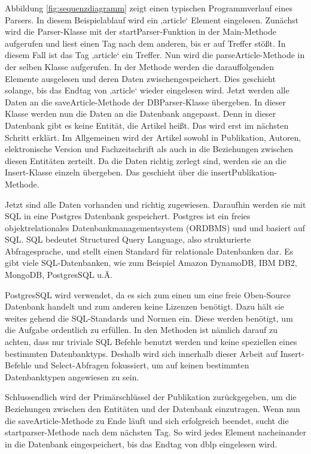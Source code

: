 Abbildung \ref{fig:sequenzdiagramm} zeigt einen typischen Programmverlauf eines Parsers. In diesem Beispielablauf wird ein ‚article‘ Element eingelesen. Zunächst wird die Parser-Klasse mit der startParser-Funktion in der Main-Methode aufgerufen und liest einen Tag nach dem anderen, bis er auf Treffer stößt. In diesem Fall ist das Tag ‚article‘ ein Treffer. Nun wird die parseArticle-Methode in der selben Klasse aufgerufen. In der Methode werden die darauffolgenden Elemente ausgelesen und deren Daten zwischengespeichert. Dies geschieht solange, bis das Endtag von ‚article‘ wieder eingelesen wird. Jetzt werden alle Daten an die saveArticle-Methode der DBParser-Klasse übergeben. In dieser Klasse werden nun die Daten an die Datenbank angepasst. Denn in dieser Datenbank gibt es keine Entität, die Artikel heißt. Das wird erst im nächsten Schritt erklärt. Im Allgemeinen wird der Artikel sowohl in Publikation, Autoren, elektronische Version und Fachzeitschrift als auch in die Beziehungen zwischen diesen Entitäten zerteilt. Da die Daten richtig zerlegt sind, werden sie an die Insert-Klasse einzeln übergeben. Das geschieht über die insertPublikation-Methode.


Jetzt sind alle Daten vorhanden und richtig zugewiesen. Daraufhin werden sie mit SQL in eine Postgres Datenbank gespeichert. Postgres ist ein freies objektrelationales Datenbankmanagementsystem (ORDBMS) und und basiert auf SQL.
SQL bedeutet Structured Query Language, also strukturierte Abfragesprache, und stellt einen Standard für relationale Datenbanken dar. Es gibt viele SQL-Datenbanken, wie zum Beispiel Amazon DynamoDB, IBM DB2, MongoDB, PostgresSQL u.Ä. 

PostgresSQL wird verwendet, da es sich zum einen um eine freie Oben-Source Datenbank handelt und zum anderen keine Lizenzen benötigt. Dazu hält sie weites gehend die SQL-Standards und Normen ein. Diese werden benötigt, um die Aufgabe ordentlich zu erfüllen. In den Methoden ist nämlich darauf zu achten, dass nur triviale SQL Befehle benutzt werden und keine speziellen eines bestimmten Datenbanktyps. Deshalb wird sich innerhalb dieser Arbeit auf Insert-Befehle und Select-Abfragen fokussiert, um auf keinen bestimmten Datenbanktypen angewiesen zu sein. 

Schlussendlich wird der Primärschlüssel der Publikation zurückgegeben, um die Beziehungen zwischen den Entitäten und der Datenbank einzutragen. Wenn nun die saveArticle-Methode zu Ende läuft und sich erfolgreich beendet, sucht die startparser-Methode nach dem nächsten Tag. So wird jedes Element nacheinander in die Datenbank eingespeichert, bis das Endtag von dblp eingelesen wird. 


